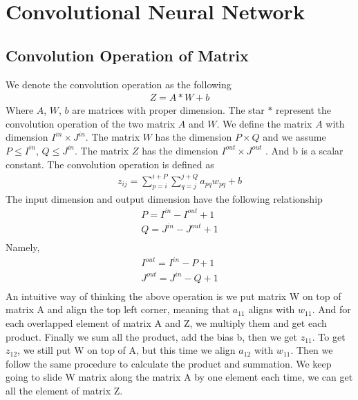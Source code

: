 \documentclass[a4paper]{article}
\begin{document}
\section{Convolutional Neural Network}
\subsection{Convolution Operation of Matrix}
We denote the convolution operation as the following
\begin{align*}
	Z= A*W +b
\end{align*}
Where $A$, $W$, $b$ are matrices with proper dimension. The star $*$ represent the convolution operation of the two matrix $A$ and $W$. We define the matrix $A$ with dimension $I^{in} \times J^{in}$. The matrix $W$ has the dimension $P \times Q$ and we assume $P \leq I^{in}$, $Q \leq J^{in}$. The matrix $Z$ has the dimension $I^{out} \times J^{out}$ . And b is a scalar constant. The convolution operation is defined as 
\begin{align*}
	z_{ij} = \sum_{p=i}^{i+P} \sum_{q=j}^{j+Q}  a_{pq} w_{pq} + b
\end{align*}
The input dimension and output dimension have the following relationship
\begin{align*}
	P  = I^{in} - I^{out} + 1 \\
	Q =  J^{in} - J^{out} + 1 \\
\end{align*}
Namely,
\begin{align*}
	I^{out}  = I^{in} - P  + 1 \\
	J^{out}  = J^{in} - Q  + 1 \\
\end{align*}
An intuitive way of thinking the above operation is we put matrix W on top of matrix A and align the top left corner, meaning that $a_{11}$ aligns with $w_{11}$. And for each overlapped element of matrix A and Z, we multiply them and get each product. Finally we sum all the product, add the bias b, then we get $z_{11}$. To get $z_{12}$, we still put W on top of A, but this time we align $a_{12}$ with $w_{11}$. Then we follow the same procedure to calculate the product and summation. We keep going to slide W matrix along the matrix A by one element each time, we can get all the element of matrix Z.  
\end{document}
